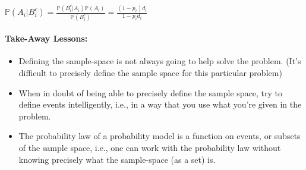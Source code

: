 \documentclass[6008notes.tex]{subfiles}
\begin{document}
{\centering$\mathbb {P}(A_ i | B_ i^ c) = \frac{\mathbb {P}(B_ i^ c | A_ i) \mathbb {P}(A_ i)}{\mathbb {P}(B_ i^ c)} = \frac{(1-p_ i) d_ i}{1 - p_ i d_ i}$ \par}
 
\paragraph{Take-Away Lessons:}

\begin{itemize}
\item Defining the sample-space is not always going to help solve the problem. (It's difficult to precisely define the sample space for this particular problem)

\item When in doubt of being able to precisely define the sample space, try to define events intelligently, i.e., in a way that you use what you're given in the problem.

\item The probability law of a probability model is a function on events, or subsets of the sample space, i.e., one can work with the probability law without knowing precisely what the sample-space (as a set) is.
\end{itemize}
\end{document}
